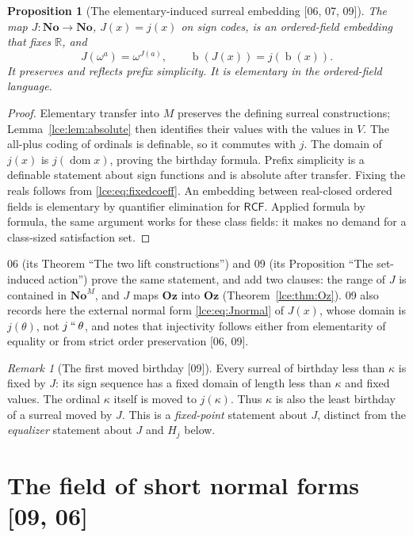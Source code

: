 \documentclass[11pt,letterpaper]{article}
\numberwithin{equation}{section}
\newtheorem{proposition}[theorem]{Proposition}
\theoremstyle{definition}
\theoremstyle{remark}
\newtheorem{remark}[theorem]{Remark}
\newcommand{\No}{\mathbf{No}}
\newcommand{\Oz}{\mathbf{Oz}}
\newcommand{\R}{\mathbb R}
\newcommand{\dom}{\operatorname{dom}}
\newcommand{\bd}{\operatorname{b}}
\newcommand{\imset}[2]{#1\mathbin{``}#2}
\newcommand{\RCF}{\mathsf{RCF}}
\newcommand{\thref}[1]{Theorem~\ref{#1}}
\newcommand{\leref}[1]{Lemma~\ref{#1}}
\newcommand{\src}[1]{\textup{\textsf{\small[#1]}}}%
\begin{document}
\begin{proposition}[The elementary-induced surreal embedding \src{06, 07, 09}]\label{lce:prop:J}
The map $J:\No\to\No$, $J(x)=j(x)$ on sign codes, is an ordered-field
embedding that fixes $\R$, and
\[
 J(\omega^a)=\omega^{J(a)},\qquad
 \bd(J(x))=j(\bd(x)).
\]
It preserves and reflects prefix simplicity. It is elementary in the
ordered-field language.
\end{proposition}
\begin{proof}
Elementary transfer into $M$ preserves the defining surreal constructions;
\leref{lce:lem:absolute} then identifies their values with the values in $V$.
The all-plus coding of ordinals is definable, so it commutes with $j$.
The domain of $j(x)$ is $j(\dom x)$, proving the birthday formula.
Prefix simplicity is a definable statement about sign functions and is
absolute after transfer. Fixing the reals follows from \eqref{lce:eq:fixedcoeff}.
An embedding between real-closed ordered fields is elementary by
quantifier elimination for $\RCF$. Applied formula by formula, the same
argument works for these class fields: it makes no demand for a class-sized
satisfaction set.
\end{proof}
06 (its Theorem ``The two lift constructions'') and 09 (its Proposition
``The set-induced action'') prove the same statement, and add two clauses:
the range of $J$ is contained in $\No^M$, and $J$ maps $\Oz$ into $\Oz$
(\thref{lce:thm:Oz}). 09 also records here the external normal form
\eqref{lce:eq:Jnormal} of $J(x)$, whose domain is $j(\theta)$, not
$\imset j\theta$, and notes that injectivity follows either from
elementarity of equality or from strict order preservation \src{06, 09}.

\begin{remark}[The first moved birthday \src{09}]\label{lce:sg:rem:firstmoved}
Every surreal of birthday less than $\kappa$ is fixed by $J$: its sign
sequence has a fixed domain of length less than $\kappa$ and fixed values.
The ordinal $\kappa$ itself is moved to $j(\kappa)$. Thus $\kappa$ is also
the least birthday of a surreal moved by $J$. This is a \emph{fixed-point}
statement about $J$, distinct from the \emph{equalizer} statement about $J$
and $H_j$ below.
\end{remark}

\section{The field of short normal forms \src{09, 06}}\label{lce:sg:sec:short}
\end{document}
